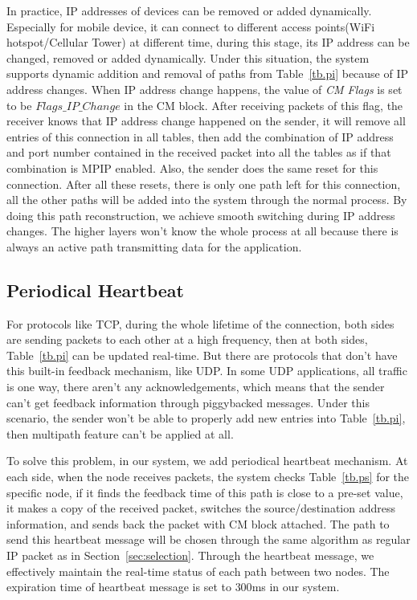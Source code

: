 
In practice, IP addresses of devices can be removed or added dynamically. Especially for mobile device, it can connect to different access points(WiFi hotspot/Cellular Tower) at different time, during this stage, its IP address can be changed, removed or added dynamically. Under this situation, the system supports dynamic addition and removal of paths from Table~\ref{tb.pi} because of IP address changes. When IP address change happens, the value of \emph{CM Flags} is set to be $Flags\_IP\_Change$ in the CM block. After receiving packets of this flag, the receiver knows that IP address change happened on the sender, it will remove all entries of this connection in all tables, then add the combination of IP address and port number contained in the received packet into all the tables as if that combination is MPIP enabled.
Also, the sender does the same reset for this connection. After all these resets, there is only one path left for this connection, all the other paths will be added into the system through the normal process. By doing this path reconstruction, we achieve smooth switching during IP address changes. The higher layers won't know the whole process at all because there is always an active path transmitting data for the application.


\subsection{Periodical Heartbeat}

For protocols like TCP, during the whole lifetime of the connection, both sides are sending packets to each other at a high frequency, then at both sides, Table~\ref{tb.pi} can be updated real-time. But there are protocols that don't have this built-in feedback mechanism, like UDP. In some UDP applications, all traffic is one way, there aren't any acknowledgements, which means that the sender can't get feedback information through piggybacked messages. Under this scenario, the sender won't be able to properly add new entries into Table~\ref{tb.pi}, then multipath feature can't be applied at all. 

To solve this problem, in our system, we add periodical heartbeat mechanism. At each side, when the node receives packets, the system checks Table~\ref{tb.ps} for the specific node, if it finds the feedback time of this path is close to a pre-set value, it makes a copy of the received packet, switches the source/destination address information, and sends back the packet with CM block attached. The path to send this heartbeat message will be chosen through the same algorithm as regular IP packet as in Section~\ref{sec:selection}. Through the heartbeat message, we effectively maintain the real-time status of each path between two nodes. The expiration time of heartbeat message is set to $300$ms in our system.

